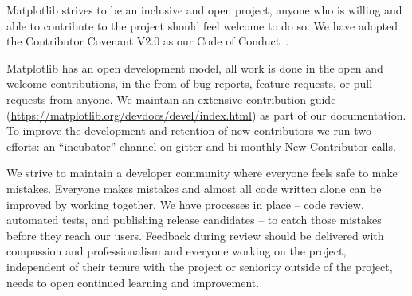 \documentclass[12pt]{article}
\numberwithin{page}{section}
\begin{document}

Matplotlib strives to be an inclusive and open project, anyone who is
willing and able to contribute to the project should feel welcome to
do so.  We have adopted the Contributor Covenant V2.0 as
our Code of Conduct~\cite{CoC}.

Matplotlib has an open development model, all work is done in the open and
welcome contributions, in the from of bug reports, feature requests, or pull
requests from anyone.  We maintain an extensive contribution guide
(\url{https://matplotlib.org/devdocs/devel/index.html}) as part of our
documentation.  To improve the development and retention of new contributors we
run two efforts: an ``incubator'' channel on gitter and bi-monthly New
Contributor calls.


We strive to maintain a developer community where everyone feels safe to make
mistakes. Everyone makes mistakes and almost all code written alone can be
improved by working together.  We have processes in place -- code review,
automated tests, and publishing release candidates -- to catch those mistakes
before they reach our users.  Feedback during review should be delivered with
compassion and professionalism and everyone working on the project, independent
of their tenure with the project or seniority outside of the project, needs to
open continued learning and improvement.
\end{document}
